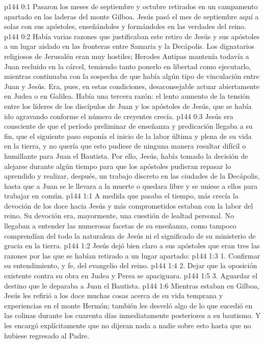 \author{Comisión de seres intermedios}
\vs p144 0:1 Pasaron los meses de septiembre y octubre retirados en un campamento apartado en las laderas del monte Gilboa. Jesús pasó el mes de septiembre aquí a solas con sus apóstoles, enseñándoles y formándoles en las verdades del reino.
\vs p144 0:2 Había varias razones que justificaban este retiro de Jesús y sus apóstoles a un lugar aislado en las fronteras entre Samaria y la Decápolis. Los dignatarios religiosos de Jerusalén eran muy hostiles; Herodes Antipas mantenía todavía a Juan recluido en la cárcel, temiendo tanto ponerlo en libertad como ejecutarlo, mientras continuaba con la sospecha de que había algún tipo de vinculación entre Juan y Jesús. Era, pues, en estas condiciones, desaconsejable actuar abiertamente en Judea o en Galilea. Había una tercera razón: el lento aumento de la tensión entre los líderes de los discípulos de Juan y los apóstoles de Jesús, que se había ido agravando conforme el número de creyentes crecía.
\vs p144 0:3 Jesús era consciente de que el período preliminar de enseñanza y predicación llegaba a su fin, que el siguiente paso suponía el inicio de la labor última y plena de su vida en la tierra, y no quería que esto pudiese de ninguna manera resultar difícil o humillante para Juan el Bautista. Por ello, Jesús, había tomado la decisión de alejarse durante algún tiempo para que los apóstoles pudieran repasar lo aprendido y realizar, después, un trabajo discreto en las ciudades de la Decápolis, hasta que a Juan se le llevara a la muerte o quedara libre y se uniese a ellos para trabajar en común.
\vs p144 1:1 A medida que pasaba el tiempo, más crecía la devoción de los doce hacia Jesús y más comprometidos estaban con la labor del reino. Su devoción era, mayormente, una cuestión de lealtad personal. No llegaban a entender las numerosas facetas de su enseñanza, como tampoco comprendían del todo la naturaleza de Jesús ni el significado de su ministerio de gracia en la tierra.
\vs p144 1:2 Jesús dejó bien claro a sus apóstoles que eran tres las razones por las que se habían retirado a un lugar apartado:
\vs p144 1:3 1. Confirmar su entendimiento, y fe, del evangelio del reino.
\vs p144 1:4 2. Dejar que la oposición existente contra su obra en Judea y Perea se apaciguara.
\vs p144 1:5 3. Aguardar el destino que le deparaba a Juan el Bautista.
\vs p144 1:6 Mientras estaban en Gilboa, Jesús les refirió a los doce muchas cosas acerca de su vida temprana y experiencias en el monte Hermón; también les desveló algo de lo que sucedió en las colinas durante los cuarenta días inmediatamente posteriores a su bautismo. Y les encargó explícitamente que no dijeran nada a nadie sobre esto hasta que no hubiese regresado al Padre.
